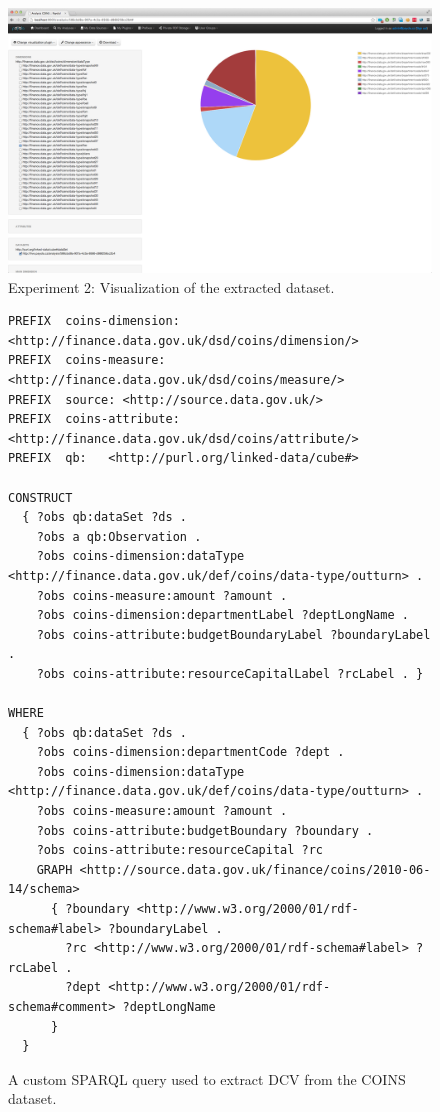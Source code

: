 \begin{figure}
  \centering
  \includegraphics[width=140mm]{img/payola-exp-02-result.png}
  \caption{Experiment 2: Visualization of the extracted dataset.}
  \label{fig:payola-exp-02-result}
\end{figure}

\begin{figure}
  \scriptsize
\begin{verbatim}
PREFIX  coins-dimension: <http://finance.data.gov.uk/dsd/coins/dimension/>
PREFIX  coins-measure: <http://finance.data.gov.uk/dsd/coins/measure/>
PREFIX  source: <http://source.data.gov.uk/>
PREFIX  coins-attribute: <http://finance.data.gov.uk/dsd/coins/attribute/>
PREFIX  qb:   <http://purl.org/linked-data/cube#>

CONSTRUCT 
  { ?obs qb:dataSet ?ds .
    ?obs a qb:Observation .
    ?obs coins-dimension:dataType <http://finance.data.gov.uk/def/coins/data-type/outturn> .
    ?obs coins-measure:amount ?amount .
    ?obs coins-dimension:departmentLabel ?deptLongName .
    ?obs coins-attribute:budgetBoundaryLabel ?boundaryLabel .
    ?obs coins-attribute:resourceCapitalLabel ?rcLabel . }

WHERE
  { ?obs qb:dataSet ?ds .
    ?obs coins-dimension:departmentCode ?dept .
    ?obs coins-dimension:dataType <http://finance.data.gov.uk/def/coins/data-type/outturn> .
    ?obs coins-measure:amount ?amount .
    ?obs coins-attribute:budgetBoundary ?boundary .
    ?obs coins-attribute:resourceCapital ?rc
    GRAPH <http://source.data.gov.uk/finance/coins/2010-06-14/schema>
      { ?boundary <http://www.w3.org/2000/01/rdf-schema#label> ?boundaryLabel .
        ?rc <http://www.w3.org/2000/01/rdf-schema#label> ?rcLabel .
        ?dept <http://www.w3.org/2000/01/rdf-schema#comment> ?deptLongName
      }
  }
\end{verbatim}
\caption{A custom SPARQL query used to extract DCV from the COINS dataset.}
\label{fig:custom-coins-query}
\end{figure}

